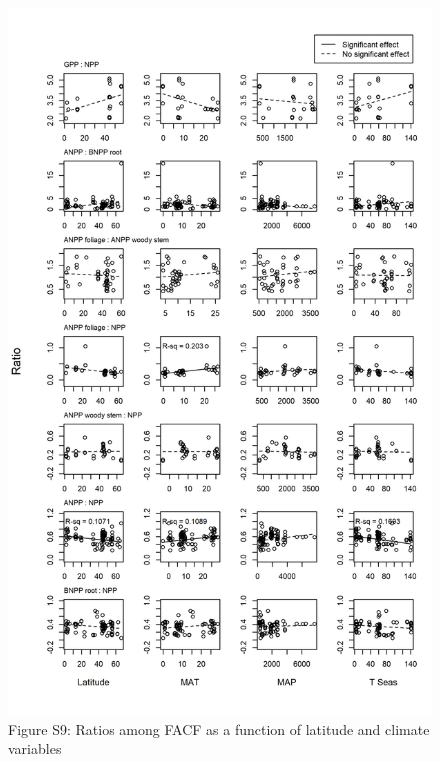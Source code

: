 \documentclass[]{article}
\begin{document}
\begin{figure}[H]

{\centering \includegraphics[width=1\linewidth]{tables_figures/ratio_grid_plots} 

}

\caption{Figure S9: Ratios among FACF as a function of latitude and climate variables}\label{fig:unnamed-chunk-15}
\end{figure}
\end{document}
